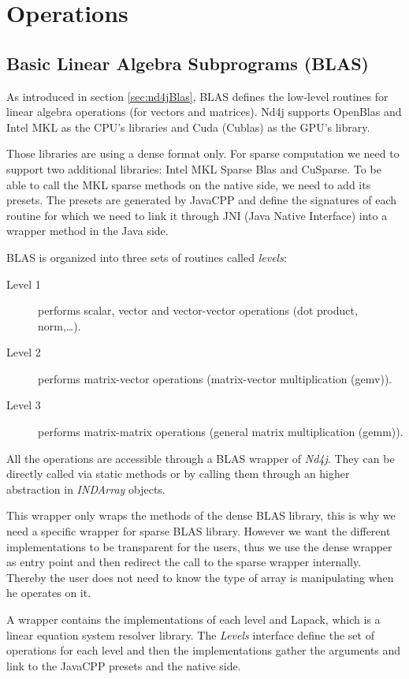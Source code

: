 \chapter{Operations}

\section{Basic Linear Algebra Subprograms (BLAS)}
As introduced in section \ref{sec:nd4jBlas}, BLAS defines the low-level routines for linear algebra operations (for vectors and matrices). Nd4j supports OpenBlas and Intel MKL as the CPU's libraries and Cuda (Cublas) as the GPU's library.

Those libraries are using a dense format only. For sparse computation we need to support two additional libraries: Intel MKL Sparse Blas and CuSparse. To be able to call the MKL sparse methods on the native side, we need to add its presets. The presets are generated by JavaCPP and define the signatures of each routine for which we need to link it through JNI (Java Native Interface)  into a wrapper method in the Java side.

BLAS is organized into three sets of routines called \textit{levels}:
\begin{description}
	\item [Level 1] performs scalar, vector and vector-vector operations (dot product, norm,\dots).
	\item [Level 2] performs matrix-vector operations (matrix-vector multiplication (gemv)).
	\item [Level 3] performs matrix-matrix operations (general matrix multiplication (gemm)).
\end{description} 
 
 All the operations are accessible through a BLAS wrapper of \textit{Nd4j}. They can be directly called via static methods or by calling them through an higher abstraction in \textit{INDArray} objects.
 
 This wrapper only wraps the methods of the dense BLAS library, this is why we need a specific wrapper for sparse BLAS library. However we want the different implementations to be transparent for the users, thus we use the dense wrapper as entry point and then redirect the call to the sparse wrapper internally. Thereby the user does not need to know the type of array is manipulating when he operates on it.
 
 A wrapper contains the implementations of each level and Lapack, which is a linear equation system resolver library. The \textit{Levels} interface define the set of operations for each level and then the implementations gather the arguments and link to the JavaCPP presets and the native side.
 
